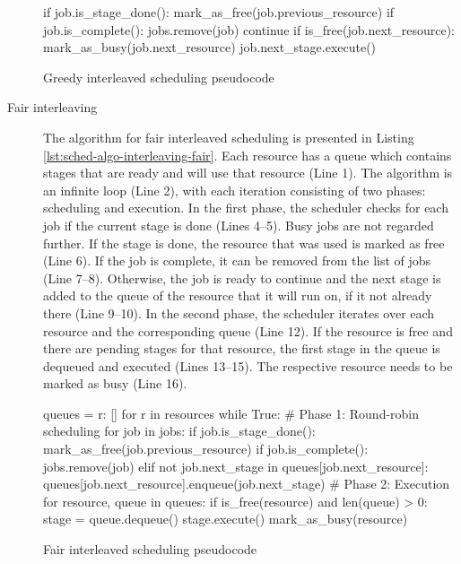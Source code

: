 \begin{description}
\begin{listing}[h]
\begin{pythoncode}
    if job.is_stage_done():
        mark_as_free(job.previous_resource)
        if job.is_complete():
            jobs.remove(job)
            continue
        if is_free(job.next_resource):
           mark_as_busy(job.next_resource)
           job.next_stage.execute()
\end{pythoncode}
\unskip
\caption{Greedy interleaved scheduling pseudocode}
\label{lst:sched-algo-interleaving-greedy}
\end{listing}
	\item[Fair interleaving] The algorithm for fair interleaved scheduling is presented in Listing \ref{lst:sched-algo-interleaving-fair}. Each resource has a queue which contains stages that are ready and will use that resource (Line 1). The algorithm is an infinite loop (Line 2), with each iteration consisting of two phases: scheduling and execution. In the first phase, the scheduler checks for each job if the current stage is done (Lines 4--5). Busy jobs are not regarded further. If the stage is done, the resource that was used is marked as free (Line 6). If the job is complete, it can be removed from the list of jobs (Line 7--8). Otherwise, the job is ready to continue and the next stage is added to the queue of the resource that it will run on, if it not already there (Line 9--10). In the second phase, the scheduler iterates over each resource and the corresponding queue (Line 12). If the resource is free and there are pending stages for that resource, the first stage in the queue is dequeued and executed (Lines 13--15). The respective resource needs to be marked as busy (Line 16).
\begin{listing}[h]
\begin{pythoncode}
queues = {r: [] for r in resources}
while True:
 # Phase 1: Round-robin scheduling
 for job in jobs:
     if job.is_stage_done():
         mark_as_free(job.previous_resource)
         if job.is_complete():
             jobs.remove(job)
         elif not job.next_stage in queues[job.next_resource]:
             queues[job.next_resource].enqueue(job.next_stage)
 # Phase 2: Execution
 for resource, queue in queues:
     if is_free(resource) and len(queue) > 0:
         stage = queue.dequeue()
         stage.execute()
         mark_as_busy(resource)
\end{pythoncode}
\unskip
\caption{Fair interleaved scheduling pseudocode}
\label{lst:sched-algo-interleaving-fair}
\end{listing}
\end{description}

